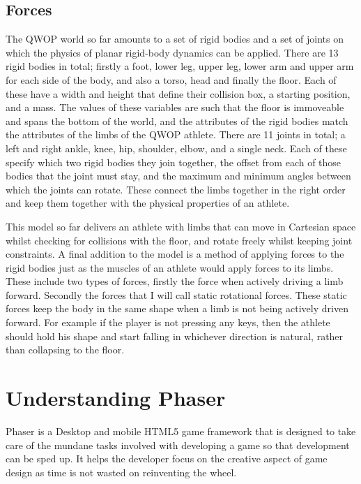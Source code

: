\documentclass[12pt,a4paper,twoside,openright]{report}
\begin{document}
\subsection{Forces}
\label{sub:forces}
The QWOP world so far amounts to a set of rigid bodies and a set of joints on which the physics of planar rigid-body dynamics can be applied.
There are 13 rigid bodies in total; firstly a foot, lower leg, upper leg, lower arm and upper arm for each side of the body, and also a torso, head and finally the floor. Each of these have a width and height that define their collision box, a starting position, and a mass.
The values of these variables are such that the floor is immoveable and spans the bottom of the world, and the attributes of the rigid bodies match the attributes of the limbs of the QWOP athlete.
There are 11 joints in total; a left and right ankle, knee, hip, shoulder, elbow, and a single neck. Each of these specify which two rigid bodies they join together, the offset from each of those bodies that the joint must stay, and the maximum and minimum angles between which the joints can rotate. These connect the limbs together in the right order and keep them together with the physical properties of an athlete.

This model so far delivers an athlete with limbs that can move in Cartesian space whilst checking for collisions with the floor, and rotate freely whilst keeping joint constraints.
A final addition to the model is a method of applying forces to the rigid bodies just as the muscles of an athlete would apply forces to its limbs.
These include two types of forces, firstly the force when actively driving a limb forward. Secondly the forces that I will call static rotational forces. These static forces keep the body in the same shape when a limb is not being actively driven forward.
For example if the player is not pressing any keys, then the athlete should hold his shape and start falling in whichever direction is natural, rather than collapsing to the floor.


\section{Understanding Phaser}
\label{phaser}

Phaser is a Desktop and mobile HTML5 game framework that is designed to take care of the mundane tasks involved with developing a game so that development can be sped up. It helps the developer focus on the creative aspect of game design as time is not wasted on reinventing the wheel.
\end{document}
